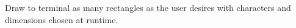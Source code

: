  Draw to terminal as many rectangles as the user desires
  with characters and dimensions chosen at runtime.
